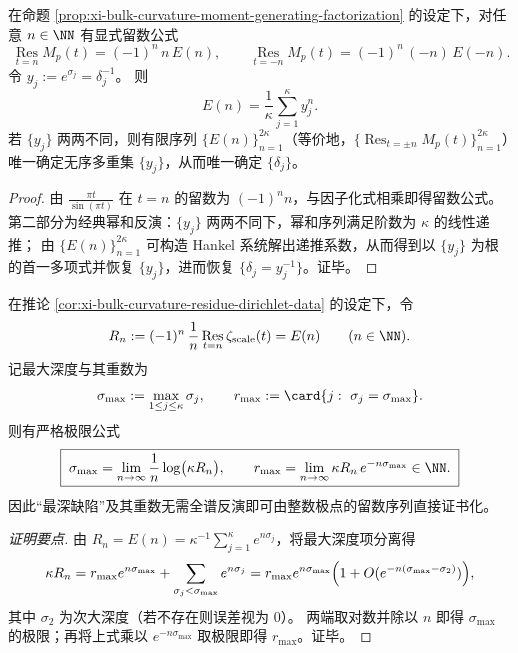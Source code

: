 \begin{corollary}\label{cor:xi-bulk-curvature-residue-dirichlet-data}
在命题 \ref{prop:xi-bulk-curvature-moment-generating-factorization} 的设定下，对任意 \(n\in\NN\) 有显式留数公式
\[
\boxed{\;
\operatorname*{Res}_{t=n}M_p(t)=(-1)^n\,n\,E(n),\qquad
\operatorname*{Res}_{t=-n}M_p(t)=(-1)^n\,(-n)\,E(-n).\;}
\]
令 \(y_j:=e^{\sigma_j}=\delta_j^{-1}\)。
则
\[
E(n)=\frac{1}{\kappa}\sum_{j=1}^{\kappa}y_j^{n}.
\]
若 \(\{y_j\}\) 两两不同，则有限序列 \(\{E(n)\}_{n=1}^{2\kappa}\)（等价地，\(\{\operatorname*{Res}_{t=\pm n}M_p(t)\}_{n=1}^{2\kappa}\)）唯一确定无序多重集 \(\{y_j\}\)，从而唯一确定 \(\{\delta_j\}\)。
\end{corollary}
\begin{proof}
由
\(
\frac{\pi t}{\sin(\pi t)}
\)
在 \(t=n\) 的留数为 \((-1)^n n\)，与因子化式相乘即得留数公式。
第二部分为经典幂和反演：\(\{y_j\}\) 两两不同下，幂和序列满足阶数为 \(\kappa\) 的线性递推；
由 \(\{E(n)\}_{n=1}^{2\kappa}\) 可构造 Hankel 系统解出递推系数，从而得到以 \(\{y_j\}\) 为根的首一多项式并恢复 \(\{y_j\}\)，进而恢复 \(\{\delta_j=y_j^{-1}\}\)。证毕。
\end{proof}


\begin{corollary}\label{cor:xi-bulk-curvature-residue-extremal-recovery}
在推论 \ref{cor:xi-bulk-curvature-residue-dirichlet-data} 的设定下，令
\[
R_n:=(-1)^n\,\frac{1}{n}\operatorname*{Res}_{t=n}\zeta_{\mathrm{scale}}(t)=E(n)\qquad(n\in\NN).
\]
记最大深度与其重数为
\[
\sigma_{\max}:=\max_{1\le j\le\kappa}\sigma_j,
\qquad
r_{\max}:=\card\{j:\ \sigma_j=\sigma_{\max}\}.
\]
则有严格极限公式
\[
\boxed{\;
\sigma_{\max}=\lim_{n\to\infty}\frac{1}{n}\log\bigl(\kappa R_n\bigr),\qquad
r_{\max}=\lim_{n\to\infty}\kappa R_n\,e^{-n\sigma_{\max}}\in\NN.\;}
\]
因此“最深缺陷”及其重数无需全谱反演即可由整数极点的留数序列直接证书化。
\end{corollary}
\begin{proof}[证明要点]
由 \(R_n=E(n)=\kappa^{-1}\sum_{j=1}^{\kappa}e^{n\sigma_j}\)，将最大深度项分离得
\[
\kappa R_n=r_{\max}e^{n\sigma_{\max}}+\sum_{\sigma_j<\sigma_{\max}}e^{n\sigma_j}
=r_{\max}e^{n\sigma_{\max}}\Bigl(1+O(e^{-n(\sigma_{\max}-\sigma_2)})\Bigr),
\]
其中 \(\sigma_2\) 为次大深度（若不存在则误差视为 \(0\)）。
两端取对数并除以 \(n\) 即得 \(\sigma_{\max}\) 的极限；再将上式乘以 \(e^{-n\sigma_{\max}}\) 取极限即得 \(r_{\max}\)。证毕。
\end{proof}

